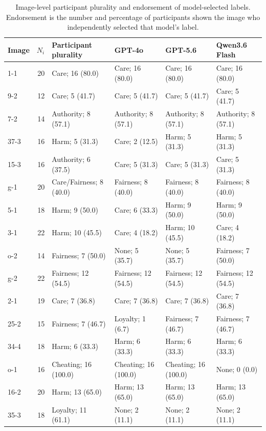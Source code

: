 \begin{table}[!htbp]
    \centering
    \caption{Image-level participant plurality and endorsement of
    model-selected labels. Endorsement is the number and percentage of
    participants shown the image who independently selected that model's
    label.}
    \label{tab:image_level_support}
    \footnotesize
    \setlength{\tabcolsep}{3pt}
    \renewcommand{\arraystretch}{1.12}
    \begin{tabular}{@{}lr
        >{\raggedright\arraybackslash}p{}
        >{\raggedright\arraybackslash}p{}
        >{\raggedright\arraybackslash}p{}
        >{\raggedright\arraybackslash}p{}@{}}
        \toprule
        Image & \(N_i\) & Participant plurality & GPT-4o & GPT-5.6 &
        Qwen3.6 Flash \\
        \midrule
        1-1  & 20 & Care; 16 (80.0) & Care; 16 (80.0) & Care; 16 (80.0) & Care; 16 (80.0) \\
        9-2  & 12 & Care; 5 (41.7) & Care; 5 (41.7) & Care; 5 (41.7) & Care; 5 (41.7) \\
        7-2  & 14 & Authority; 8 (57.1) & Authority; 8 (57.1) & Authority; 8 (57.1) & Authority; 8 (57.1) \\
        37-3 & 16 & Harm; 5 (31.3) & Care; 2 (12.5) & Harm; 5 (31.3) & Harm; 5 (31.3) \\
        15-3 & 16 & Authority; 6 (37.5) & Care; 5 (31.3) & Care; 5 (31.3) & Care; 5 (31.3) \\
        g-1  & 20 & Care/Fairness; 8 (40.0) & Fairness; 8 (40.0) & Fairness; 8 (40.0) & Fairness; 8 (40.0) \\
        5-1  & 18 & Harm; 9 (50.0) & Care; 6 (33.3) & Harm; 9 (50.0) & Harm; 9 (50.0) \\
        3-1  & 22 & Harm; 10 (45.5) & Care; 4 (18.2) & Harm; 10 (45.5) & Care; 4 (18.2) \\
        o-2  & 14 & Fairness; 7 (50.0) & None; 5 (35.7) & None; 5 (35.7) & Fairness; 7 (50.0) \\
        g-2  & 22 & Fairness; 12 (54.5) & Fairness; 12 (54.5) & Fairness; 12 (54.5) & Fairness; 12 (54.5) \\
        2-1  & 19 & Care; 7 (36.8) & Care; 7 (36.8) & Care; 7 (36.8) & Care; 7 (36.8) \\
        25-2 & 15 & Fairness; 7 (46.7) & Loyalty; 1 (6.7) & Fairness; 7 (46.7) & Fairness; 7 (46.7) \\
        34-4 & 18 & Harm; 6 (33.3) & Harm; 6 (33.3) & Harm; 6 (33.3) & Harm; 6 (33.3) \\
        o-1  & 16 & Cheating; 16 (100.0) & Cheating; 16 (100.0) & Cheating; 16 (100.0) & None; 0 (0.0) \\
        16-2 & 20 & Harm; 13 (65.0) & Harm; 13 (65.0) & Harm; 13 (65.0) & Harm; 13 (65.0) \\
        35-3 & 18 & Loyalty; 11 (61.1) & None; 2 (11.1) & None; 2 (11.1) & None; 2 (11.1) \\
        \bottomrule
    \end{tabular}


\end{table}
